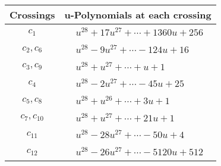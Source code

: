 \documentclass[1p]{elsarticle_modified}
\theoremstyle{definition}
\begin{document}
\begin{tabular}{m{50pt}|m{274pt}}
Crossings & \hspace{64pt}u-Polynomials at each crossing \\
\hline $$\begin{aligned}c_{1}\end{aligned}$$&$\begin{aligned}
&u^{28}+17 u^{27}+\cdots+1360 u+256
\end{aligned}$\\
\hline $$\begin{aligned}c_{2},c_{6}\end{aligned}$$&$\begin{aligned}
&u^{28}-9 u^{27}+\cdots-124 u+16
\end{aligned}$\\
\hline $$\begin{aligned}c_{3},c_{9}\end{aligned}$$&$\begin{aligned}
&u^{28}+u^{27}+\cdots+u+1
\end{aligned}$\\
\hline $$\begin{aligned}c_{4}\end{aligned}$$&$\begin{aligned}
&u^{28}-2 u^{27}+\cdots-45 u+25
\end{aligned}$\\
\hline $$\begin{aligned}c_{5},c_{8}\end{aligned}$$&$\begin{aligned}
&u^{28}+u^{26}+\cdots+3 u+1
\end{aligned}$\\
\hline $$\begin{aligned}c_{7},c_{10}\end{aligned}$$&$\begin{aligned}
&u^{28}+u^{27}+\cdots+21 u+1
\end{aligned}$\\
\hline $$\begin{aligned}c_{11}\end{aligned}$$&$\begin{aligned}
&u^{28}-28 u^{27}+\cdots-50 u+4
\end{aligned}$\\
\hline $$\begin{aligned}c_{12}\end{aligned}$$&$\begin{aligned}
&u^{28}-26 u^{27}+\cdots-5120 u+512
\end{aligned}$\\
\hline
\end{tabular}\\~\\
\end{document}
